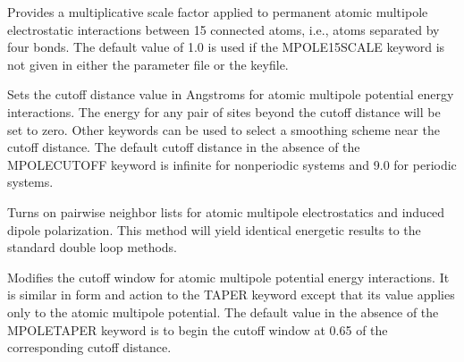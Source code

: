 \documentclass[letterpaper,11pt,english]{sphinxmanual}
\begin{document}
\ignorespaces {}\label{\detokenize{text/keywords:key-mpole-15-scale}}\begin{description}
\sphinxAtStartPar
Provides a multiplicative scale factor applied to permanent atomic multipole  electrostatic interactions between 1\sphinxhyphen{}5 connected atoms, i.e., atoms separated by four bonds. The default value of 1.0 is used if the MPOLE\sphinxhyphen{}15\sphinxhyphen{}SCALE keyword is not given in either the parameter file or the keyfile.

\end{description}

\ignorespaces {}\label{\detokenize{text/keywords:key-mpole-cutoff}}\begin{description}
\sphinxAtStartPar
Sets the cutoff distance value in Angstroms for atomic multipole potential energy interactions. The energy for any pair of sites beyond the cutoff distance will be set to zero. Other keywords can be used to select a smoothing scheme near the cutoff distance. The default cutoff distance in the absence of the MPOLE\sphinxhyphen{}CUTOFF keyword is infinite for nonperiodic systems and 9.0 for periodic systems.

\end{description}

\ignorespaces {}\label{\detokenize{text/keywords:key-mpole-list}}\begin{description}
\sphinxAtStartPar
Turns on pairwise neighbor lists for atomic multipole electrostatics and induced dipole polarization. This method will yield identical energetic results to the standard double loop methods.

\end{description}

\ignorespaces {}\label{\detokenize{text/keywords:key-mpole-taper}}\begin{description}
\sphinxAtStartPar
Modifies the cutoff window for atomic multipole potential energy interactions. It is similar in form and action to the TAPER keyword except that its value applies only to the atomic multipole potential. The default value in the absence of the MPOLE\sphinxhyphen{}TAPER keyword is to begin the cutoff window at 0.65 of the corresponding cutoff distance.

\end{description}
\end{document}
